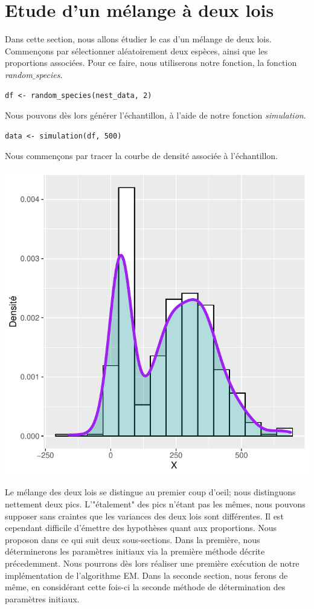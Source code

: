 \documentclass[frenchb]{report}
\newcommand{\1}{\mathbbm{1}}
\theoremstyle{definition}\newtheorem{defn}{Définition}
\theoremstyle{definition}\newtheorem{exm}{Exemple}
\theoremstyle{definition}\newtheorem{nota}{Notation}
\theoremstyle{definition}\newtheorem{rem}{Remarque}
\begin{document}
\section{Etude d'un mélange à deux lois}
Dans cette section, nous allons étudier le cas d'un mélange de deux lois. Commençons par sélectionner aléatoirement deux espèces, ainsi que les proportions associées. Pour ce faire, nous utiliserons notre fonction, la fonction \textit{random$\_$species}. 

\begin{lstlisting}
df <- random_species(nest_data, 2)
\end{lstlisting}

Nous pouvons dès lors générer l'échantillon, à l'aide de notre fonction \textit{simulation}.

\begin{lstlisting}
data <- simulation(df, 500)
\end{lstlisting}

Nous commençons par tracer la courbe de densité associée à l'échantillon.
\begin{center}
\includegraphics[scale=0.8]{dens_1.pdf}
\end{center}
Le mélange des deux lois se distingue au premier coup d'oeil; nous distinguons nettement deux pics. L'"étalement" des pics n'étant pas les mêmes, nous pouvons supposer sans craintes que les variances des deux lois sont différentes. Il est cependant difficile d'émettre des hypothèses quant aux proportions.\newline
Nous proposon dans ce qui suit deux sous-sections. Dans la première, nous déterminerons les paramètres initiaux via la première méthode décrite précedemment. Nous pourrons dès lors réaliser une première exécution de notre implémentation de l'algorithme EM.
Dans la seconde section, nous ferons de même, en considérant cette fois-ci la seconde méthode de détermination des paramètres initiaux.
\end{document}
